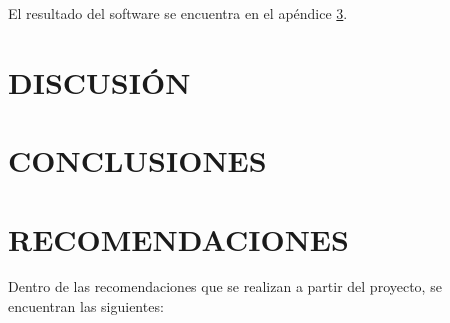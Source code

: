 \documentclass[spanish]{ieee_upb}
\begin{document}
El resultado del software se encuentra en el apéndice \ref{}.


\section{DISCUSIÓN}


\newpage
\section{CONCLUSIONES}

\newpage
\section{RECOMENDACIONES}
Dentro de las recomendaciones que se realizan a partir del proyecto, se encuentran las siguientes:
\end{document}
